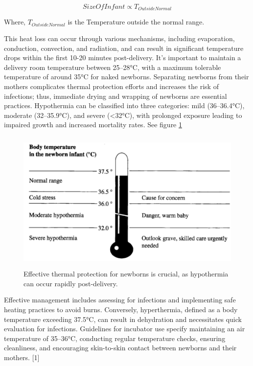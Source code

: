 \documentclass{article}
\begin{document}
\[
SizeOfInfant \propto T_{OutsideNormal}
\]

Where, \(T_{OutsideNormal}\) is the Temperature outside the normal
range.

This heat loss can occur through various mechanisms, including
evaporation, conduction, convection, and radiation, and can result in
significant temperature drops within the first 10-20 minutes
post-delivery. It's important to maintain a delivery room temperature
between 25--28°C, with a maximum tolerable temperature of around 35°C
for naked newborns. Separating newborns from their mothers complicates
thermal protection efforts and increases the risk of infections; thus,
immediate drying and wrapping of newborns are essential practices.
Hypothermia can be classified into three categories: mild (36--36.4°C),
moderate (32--35.9°C), and severe (\textless32°C), with prolonged
exposure leading to impaired growth and increased mortality rates. See
figure \ref{fig:fig3}

\begin{figure}
  \centering
  \includegraphics[width=350pt,height=200pt]{images/clipboard-2554530258.png} %
  \caption{Effective thermal protection for newborns is crucial, as hypothermia can occur rapidly post-delivery.}
  \label{fig:fig3}
\end{figure}

Effective management includes assessing for infections and implementing
safe heating practices to avoid burns. Conversely, hyperthermia, defined
as a body temperature exceeding 37.5°C, can result in dehydration and
necessitates quick evaluation for infections. Guidelines for incubator
use specify maintaining an air temperature of 35--36°C, conducting
regular temperature checks, ensuring cleanliness, and encouraging
skin-to-skin contact between newborns and their mothers. {[}1{]}
\end{document}
